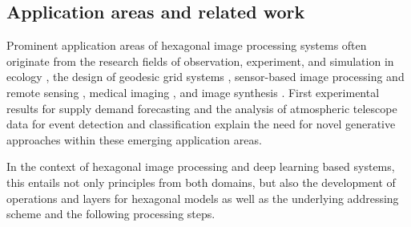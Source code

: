\documentclass{article}
\begin{document}
\subsection{Application areas and related work}

Prominent application areas of hexagonal image processing systems often originate from the research fields of observation, experiment, and simulation in ecology \cite{Birch2007}, the design of geodesic grid systems \cite{Sahr2003}, sensor-based image processing and remote sensing \cite{Ambrosio2001}, medical imaging \cite{Neeser2000}, and image synthesis \cite{Theussl2001}. First experimental results for supply demand forecasting \cite{Ke2018} and the analysis of atmospheric telescope data for event detection and classification \cite{Shilon2019} explain the need for novel generative approaches within these emerging application areas.

In the context of hexagonal image processing and deep learning based systems, this entails not only principles from both domains, but also the development of operations and layers for hexagonal models \cite{Steppa2019} as well as the underlying addressing scheme and the following processing steps.
\end{document}
